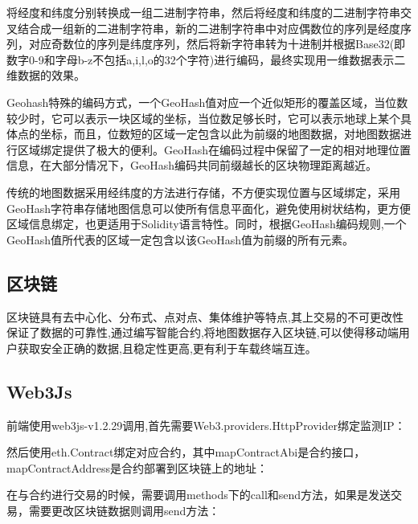 将经度和纬度分别转换成一组二进制字符串，然后将经度和纬度的二进制字符串交叉结合成一组新的二进制字符串，新的二进制字符串中对应偶数位的序列是经度序列，对应奇数位的序列是纬度序列，然后将新字符串转为十进制并根据Base32(即数字0-9和字母b-z不包括a,i,l,o的32个字符)进行编码\cite{liu2014geohash}，最终实现用一维数据表示二维数据的效果。

Geohash特殊的编码方式，一个GeoHash值对应一个近似矩形的覆盖区域，当位数较少时，它可以表示一块区域的坐标，当位数足够长时，它可以表示地球上某个具体点的坐标，而且，位数短的区域一定包含以此为前缀的地图数据，对地图数据进行区域绑定提供了极大的便利。GeoHash在编码过程中保留了一定的相对地理位置信息，在大部分情况下，GeoHash编码共同前缀越长的区块物理距离越近\cite{lposition}。

传统的地图数据采用经纬度的方法进行存储，不方便实现位置与区域绑定，采用GeoHash字符串存储地图信息可以使所有信息平面化，避免使用树状结构，更方便区域信息绑定，也更适用于Solidity语言特性。同时，根据GeoHash编码规则,一个GeoHash值所代表的区域一定包含以该GeoHash值为前缀的所有元素。

\subsection{区块链}
区块链具有去中心化、分布式、点对点、集体维护等特点,其上交易的不可更改性保证了数据的可靠性,通过编写智能合约,将地图数据存入区块链,可以使得移动端用户获取安全正确的数据,且稳定性更高,更有利于车载终端互连。

\subsection{Web3Js}
前端使用web3js-v1.2.29调用,首先需要Web3.providers.HttpProvider绑定监测IP：
\begin{center}
\end{center}

然后使用eth.Contract绑定对应合约，其中mapContractAbi是合约接口，mapContractAddress是合约部署到区块链上的地址：
\begin{center}
\end{center}

在与合约进行交易的时候，需要调用methods下的call和send方法，如果是发送交易，需要更改区块链数据则调用send方法：
\begin{center}
\end{center}

